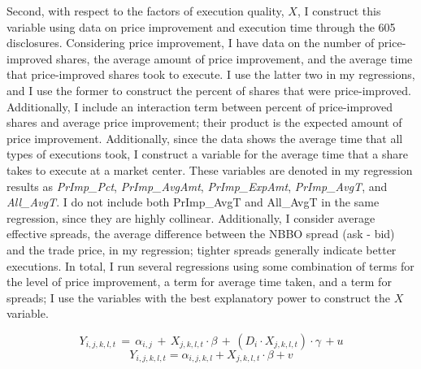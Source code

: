\documentclass[12pt,a4paper]{article}
\begin{document}
	Second, with respect to the factors of execution quality, $X$, I construct this variable using data on price improvement and execution time through the 605 disclosures. Considering price improvement, I have data on the number of price-improved shares, the average amount of price improvement, and the average time that price-improved shares took to execute. I use the latter two in my regressions, and I use the former to construct the percent of shares that were price-improved. Additionally, I include an interaction term between percent of price-improved shares and average price improvement; their product is the expected amount of price improvement. Additionally, since the data shows the average time that all types of executions took, I construct a variable for the average time that a share takes to execute at a market center. These variables are denoted in my regression results as \textit{PrImp\_Pct}, \textit{PrImp\_AvgAmt}, \textit{PrImp\_ExpAmt}, \textit{PrImp\_AvgT}, and \textit{All\_AvgT}. I do not include both PrImp\_AvgT and All\_AvgT in the same regression, since they are highly collinear. Additionally, I consider average effective spreads, the average difference between the NBBO spread (ask - bid) and the trade price, in my regression; tighter spreads generally indicate better executions. In total, I run several regressions using some combination of terms for the level of price improvement, a term for average time taken, and a term for spreads; I use the variables with the best explanatory power to construct the $X$ variable. 
	
	\begin{equation}
	Y_{i, j, k, l, t} \,=\, \alpha_{i,j} \,+\,  X_{j, k, l, t} \cdot \beta \,+\,  (D_i \cdot X_{j, k, l, t}) \cdot \gamma\, +  u
	\end{equation}	
	\begin{equation}
	Y_{i, j, k, l, t} = \alpha_{i,j,k,l} +  X_{j, k, l, t} \cdot \beta +  v
	\end{equation}	
\end{document}
